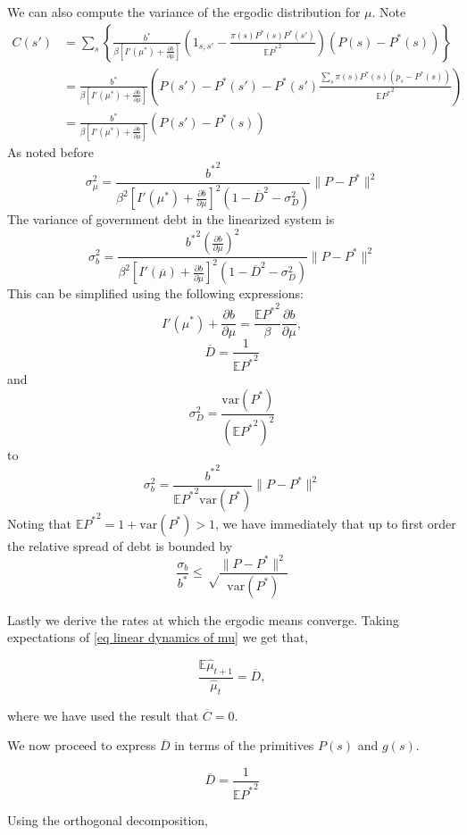 \documentclass[thmsb,11pt]{article}
\newcommand{\EE}{\mathbb E}
\newcommand{\var}{\mathrm{var}}
\newcommand{\barD}{{\overline D}}
\newcommand{\mubar}{{\overline \mu}}
\begin{document}
We can also compute the variance of the ergodic distribution for $\mu$.  Note
\[
\begin{split}
	C(s') &= \sum_s\left\{\frac{{b^{*}}}{\beta\left[I'(\mu^*)+\frac{\partial b}{\partial\mu}\right]}\left(1_{s,s'}-\frac{\pi(s) P^*(s)P^*(s')}{\EE{P^*}^2}\right)(P(s)-P^*(s)) \right\}\\
		 &=\frac{{b^{*}}}{\beta\left[I'(\mu^*)+\frac{\partial b}{\partial\mu}\right]}\left( P(s')-P^*(s') -P^*(s')\frac{\sum_s\pi(s)P^*(s)( p_s-P^*(s))}{\EE{P^*}^2}\right)\\
		&= \frac{{b^{*}}}{\beta\left[I'(\mu^*)+\frac{\partial b}{\partial\mu}\right]}( P(s')-P^*(s))
\end{split}
\]  As noted before
\[
	\sigma_{\mu}^2 = \frac{{b^{*}}^ 2}{\beta^2\left[I'(\mu^*)+\frac{\partial b}{\partial\mu}\right]^2\left(1-\barD^2-\sigma_D^2\right)}\| P-{P^*}\|^2
\]  The variance of government debt in the linearized system is
\[
	\sigma_b^2 = \frac{{b^{*}}^2\left(\frac{\partial b}{\partial\mu}\right)^2}{\beta^2\left[I'(\mubar)+\frac{\partial b}{\partial\mu}\right]^2\left(1-\barD^2-\sigma_D^2\right)}\| P-{P^*}\|^2
\]  This can be simplified using the following expressions:
\[
	I'(\mu^*)+\frac{\partial b}{\partial \mu} = \frac{\EE{P^*}^2}{\beta}\frac{\partial b}{\partial\mu},
\]
\[
	\barD = \frac{1}{\EE{P^*}^2}
\]and
\[
	\sigma_D^2 = \frac{\var({P^*})}{(\EE{P^*}^2)^2}
\] to
\begin{equation}
	\sigma^2_b = \frac{{b^{*}}^2}{\EE{P^*}^2\var({P^*})}\|P-{P^*}\|^2
\end{equation}Noting that $\EE{P^*}^2 = 1 +\var({P^*}) > 1$, we have immediately that up to first order the relative spread of debt is bounded by
\begin{equation}
	\frac{\sigma_b}{{b^{*}}} \leq \sqrt\frac{\|P-{P^*}\|^2}{\var({P^*})}
\end{equation}

Lastly we derive the rates at which the ergodic means converge. Taking expectations of \eqref{eq linear dynamics of mu} we get that,

\[\frac{\mathbb{E}\hat{\mu}_{t+1}}{\hat{\mu}_t}=\overline{D},\]

where we have used the result that $\overline{C}=0$.

We now proceed to express $\overline{D}$ in terms of the primitives $P(s)$ and $g(s)$. 

\[\overline{D}=\frac{1}{\mathbb{E}{P^*}^2}\]

Using the orthogonal decomposition, 
\end{document}
